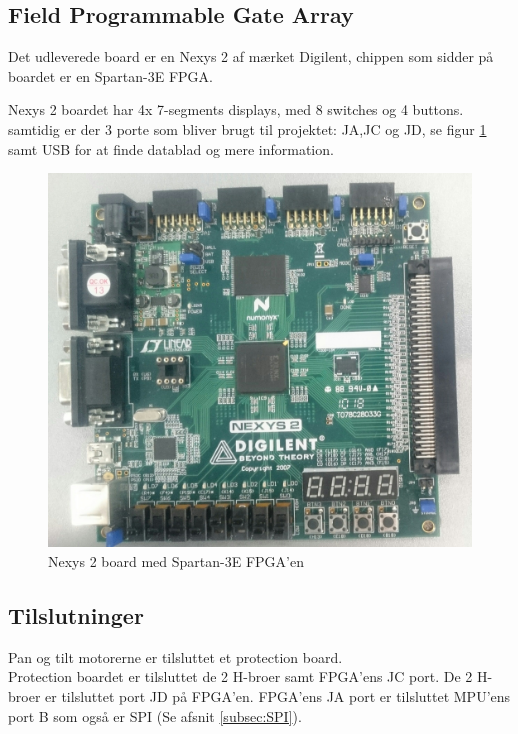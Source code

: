 \subsection{Field Programmable Gate Array}

Det udleverede board er en Nexys 2 af mærket Digilent, chippen som sidder på boardet er en Spartan-3E FPGA.

Nexys 2 boardet har 4x 7-segments displays, med 8 switches og 4 buttons. samtidig er der 3 porte som bliver brugt til projektet: JA,JC og JD, se figur \ref{fig:Nexys2Board} samt USB for at finde datablad og mere information.

\begin{figure}[!ht]
	\begin{center}
		\includegraphics[scale=0.08, angle =0]{Billeder/Nexys2Board.JPG}
	\end{center}
\caption{Nexys 2 board med Spartan-3E FPGA'en}
\label{fig:Nexys2Board}
\end{figure}

\subsection{Tilslutninger}
Pan og tilt motorerne er tilsluttet et protection board.\\
Protection boardet er tilsluttet de 2 H-broer samt FPGA'ens JC port.
De 2 H-broer er tilsluttet port JD på FPGA'en.
FPGA'ens JA port er tilsluttet MPU'ens port B som også er SPI (Se afsnit \ref{subsec:SPI}).

